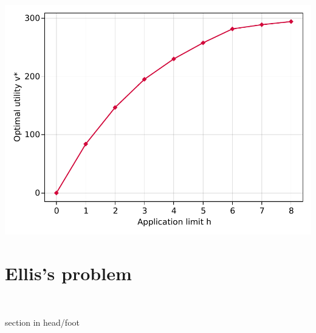 \documentclass[10pt,slidestop,compress,mathserif,notheorems]{beamer}
\newif\ifen
\theoremstyle{definition}
\theoremstyle{definition}
\begin{document}
\begin{frame}[plain]
\begin{center}
 \includegraphics[height=\textheight]{./plots/h_v-example.pdf}
\end{center}
\end{frame}





\section{Ellis's problem}

\ifen{
\begin{frame}[plain]
  \vspace{9em}
\begin{center}
~
\begin{beamercolorbox}[wd=.6\textwidth,sep=8pt,center,shadow=false,rounded=true]{section in head/foot}
    \usebeamerfont{title} \insertsectionhead \par%
  \end{beamercolorbox}
~
\end{center}
\end{frame}
}
\else{
\begin{frame}[plain]
  \vspace{9em}
\begin{center}
~
\begin{beamercolorbox}[wd=.6\textwidth,sep=8pt,center,shadow=false,rounded=true]{section in head/foot}
     \insertsectionhead \par%
  \end{beamercolorbox}
~
\end{center}
\end{frame}
}
\fi
\end{document}
